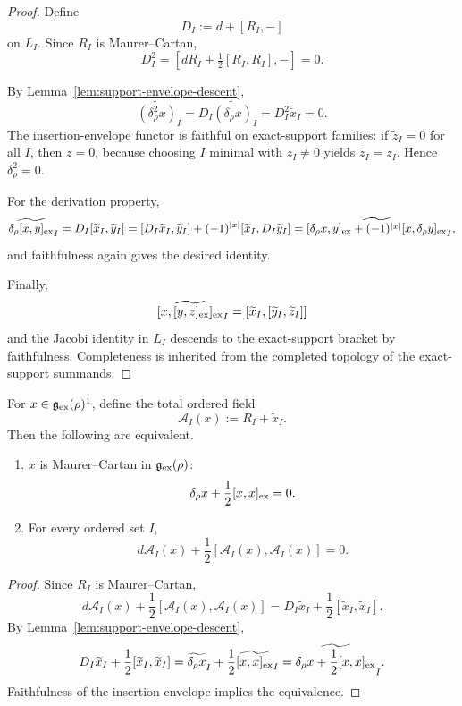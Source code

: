 \begin{proof}
Define
\[
D_I:=d+[R_I,-]
\]
on $L_I$. Since $R_I$ is Maurer--Cartan,
\[
D_I^2=[dR_I+\tfrac12[R_I,R_I],-]=0.
\]

By Lemma~\ref{lem:support-envelope-descent},
\[
\widetilde{(\delta_\rho^2 x)}_I
=
D_I\widetilde{(\delta_\rho x)}_I
=
D_I^2\widetilde x_I
=
0.
\]
The insertion-envelope functor is faithful on exact-support families:
if $\widetilde z_I=0$ for all $I$, then $z=0$, because choosing $I$ minimal with $z_I\neq 0$ yields
$\widetilde z_I=z_I$. Hence $\delta_\rho^2=0$.

For the derivation property,
\[
\widetilde{\delta_\rho[x,y]_{\mathrm{ex}}}_I
=
D_I[\widetilde x_I,\widetilde y_I]
=
[D_I\widetilde x_I,\widetilde y_I]+(-1)^{|x|}[\widetilde x_I,D_I\widetilde y_I]
=
\widetilde{[\delta_\rho x,y]_{\mathrm{ex}}+(-1)^{|x|}[x,\delta_\rho y]_{\mathrm{ex}}}_I,
\]
and faithfulness again gives the desired identity.

Finally,
\[
\widetilde{[x,[y,z]_{\mathrm{ex}}]_{\mathrm{ex}}}_I
=
[\widetilde x_I,[\widetilde y_I,\widetilde z_I]]
\]
and the Jacobi identity in $L_I$ descends to the exact-support bracket by faithfulness.
Completeness is inherited from the completed topology of the exact-support summands.
\end{proof}

\begin{theorem}
\label{thm:equivalence-with-modular-completions}
For $x\in\mathfrak g_{\mathrm{ex}}(\rho)^1$, define the total ordered field
\[
\mathcal A_I(x):=R_I+\widetilde x_I.
\]
Then the following are equivalent.

\begin{enumerate}
\item
$x$ is Maurer--Cartan in $\mathfrak g_{\mathrm{ex}}(\rho)$:
\[
\delta_\rho x+\frac12[x,x]_{\mathrm{ex}}=0.
\]

\item
For every ordered set $I$,
\[
d\mathcal A_I(x)+\frac12[\mathcal A_I(x),\mathcal A_I(x)]=0.
\]
\end{enumerate}
\end{theorem}

\begin{proof}
Since $R_I$ is Maurer--Cartan,
\[
d\mathcal A_I(x)+\frac12[\mathcal A_I(x),\mathcal A_I(x)]
=
D_I\widetilde x_I+\frac12[\widetilde x_I,\widetilde x_I].
\]
By Lemma~\ref{lem:support-envelope-descent},
\[
D_I\widetilde x_I+\frac12[\widetilde x_I,\widetilde x_I]
=
\widetilde{\delta_\rho x}_I+\frac12\widetilde{[x,x]_{\mathrm{ex}}}_I
=
\widetilde{\delta_\rho x+\frac12[x,x]_{\mathrm{ex}}}_I.
\]
Faithfulness of the insertion envelope implies the equivalence.
\end{proof}

